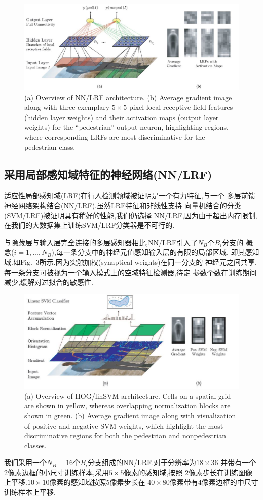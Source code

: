 \documentclass[10pt,letterpaper,journal,compsoc]{IEEEtran}
\begin{document}
\begin{figure}[!t]
\centering
\includegraphics[width=7in]{fig3.JPG}
\caption{(a) Overview of NN/LRF architecture. (b) Average gradient image along with three exemplary $5\times5$-pixel local receptive field features (hidden
layer weights) and their activation maps (output layer weights) for the “pedestrian” output neuron, highlighting regions, where corresponding LRFs
are most discriminative for the pedestrian class.}
\end{figure}
\subsection{采用局部感知域特征的神经网络(NN/LRF)}
适应性局部感知域(LRF)\cite{bib19}在行人检测领域被证明是一个有力特征,与一个
多层前馈神经网络架构结合(NN/LRF)\cite{bib75}.虽然LRF特征和非线性支持
向量机结合的分类(SVM/LRF)被证明具有稍好的性能\cite{bib49},我们仍选择
NN/LRF,因为由于超出内存限制,在我们的大数据集上训练SVM/LRF分类器是不可行的.

与隐藏层与输入层完全连接的多层感知器相比,NN/LRF引入了$N_B$个$B_i$分支的
概念($i=1,...,N_B$),每一条分支中的神经元值感知输入层的有限的局部区域,
即其感知域.如Fig.~3所示.因为突触加权(synaptical weights)在同一分支的
神经元之间共享,每一条分支可被视为一个输入模式上的空域特征检测器,待定
参数个数在训练期间减少,缓解对过拟合的敏感性.

\begin{figure}[!t]
\centering
\includegraphics[width=7in]{fig4.JPG}
\caption{(a) Overview of HOG/linSVM architecture. Cells on a spatial grid are shown in yellow, whereas overlapping normalization blocks are shown in
green. (b) Average gradient image along with visualization of positive and negative SVM weights, which highlight the most discriminative regions for
both the pedestrian and nonpedestrian classes.}
\end{figure}
我们采用一个$N_B=16$个$B_i$分支组成的NN/LRF.对于分辨率为$18\times36$
并带有一个2像素边框的小尺寸训练样本,采用$5\times5$像素的感知域,按照
2像素步长在训练图像上平移.$10\times10$像素的感知域按照5像素步长在
$40\times80$像素带有4像素边框的中尺寸训练样本上平移.
\end{document}
